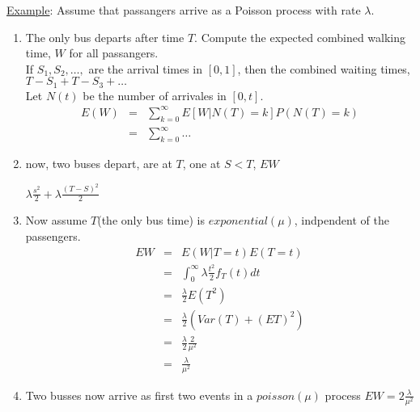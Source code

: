   \noindent \underline{Example}: Assume that passangers arrive as a Poisson
  process with rate $\lambda$.
  \begin{enumerate}
    \item The only bus departs after time $T$. Compute the expected combined 
      walking time, $W$ for all passangers.\\

      \noindent If $S_1, S_2, \ldots, $ are the arrival times in $[0, 1]$, then
      the combined waiting times, $T - S_1 + T - S_3 + \ldots$\\
      Let $N(t)$ be the number of arrivales in $[0, t]$.\\
      \begin{eqnarray*}
        E(W) & = & \sum_{k = 0}^{\infty}E[W | N(T) = k] P(N(T) = k)\\
        & = & \sum_{k  = 0}^{\infty} \ldots
      \end{eqnarray*}
    \item now, two buses depart, are at $T$, one at $S < T$, $EW$
      
      \noindent $\lambda \frac{s^2}{2} + \lambda \frac{(T - S)^2}{2}$

    \item Now assume $T$(the only bus time) is $exponential(\mu)$, indpendent
    of the passengers.\\

      \noindent 
        \begin{eqnarray*}
          EW & = & E(W | T = t)E(T = t)\\
            & = & \int_0^{\infty} \lambda\frac{t^2}{2}f_T(t)dt\\
            & = & \frac{\lambda}{2} E(T^2)\\
            & = & \frac{\lambda}{2} (Var(T) + (ET)^2)\\
            & = & \frac{\lambda}{2} \frac{2}{\mu^2}\\
            & = & \frac{\lambda}{\mu^2}
        \end{eqnarray*}
    \item Two busses now arrive as first two events in a $poisson(\mu)$ process
    $EW = 2\frac{\lambda}{\mu^2}$
  \end{enumerate}
